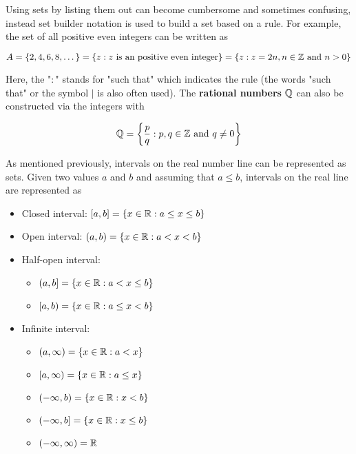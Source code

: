 \medskip

Using sets by listing them out can become cumbersome and sometimes confusing, instead set builder notation is used to build a set based on a rule. For example, the set of all positive even integers can be written as

\begin{equation}
    A = \{2,4,6,8,\dots\} = \{z : z \text{ is an positive even integer}\} = \{z : z = 2n, n\in\mathbb{Z} \text{ and } n > 0\}
\end{equation}

\noindent Here, the "$:$" stands for "such that" which indicates the rule (the words "such that" or the symbol $|$ is also often used). The \textbf{rational numbers} $\mathbb{Q}$ can also be constructed via the integers with

\begin{equation}
    \mathbb{Q} = \left\{\frac{p}{q} : p,q \in \mathbb{Z} \text{ and } q \neq 0\right\}
\end{equation}

As mentioned previously, intervals on the real number line can be represented as sets. Given two values $a$ and $b$ and assuming that $a \leq b$, intervals on the real line are represented as

\begin{itemize}
    \item Closed interval: $[a,b] = \{x \in \mathbb{R} : a \leq x \leq b\}$ \hfill {}
    \item Open interval: $(a,b) = \{x \in \mathbb{R} : a < x < b\}$ \hfill {}
    \item Half-open interval:
        \begin{itemize}
            \item $(a,b] = \{x \in \mathbb{R} : a < x \leq b\}$ \hfill \intervalinline{a}{b}{(}{]}
            \item $[a,b) = \{x \in \mathbb{R} : a \leq x < b\}$ \hfill \intervalinline{a}{b}{[}{)}
        \end{itemize}
    \item Infinite interval:
        \begin{itemize}
            \item $(a,\infty) = \{x \in \mathbb{R}: a < x\}$ \hfill {}
                \item $[a,\infty) = \{x \in \mathbb{R}: a \leq x\}$ \hfill \intervalinline{a}{$\infty$}{[}{}
                \item $(-\infty,b) = \{x \in \mathbb{R}: x < b\}$ \hfill {}
            \item $(-\infty,b] = \{x \in \mathbb{R}: x \leq b\}$ \hfill \intervalinline{$-\infty$}{b}{}{]}
            \item $(-\infty,\infty) = \mathbb{R}$ \hfill \intervalinline{$-\infty$}{$\infty$}{}{}
        \end{itemize}
\end{itemize}

